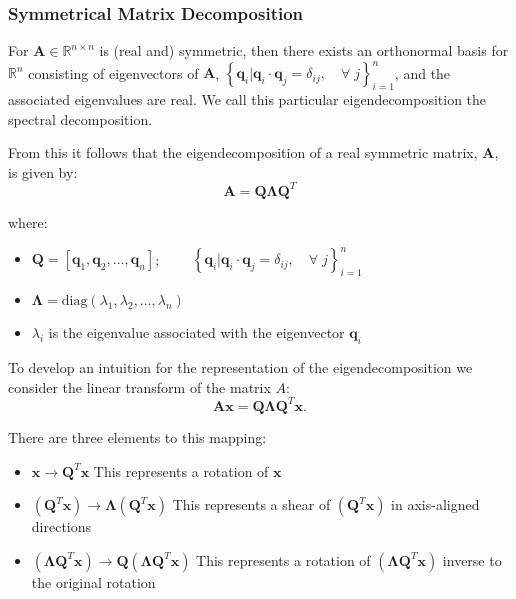 \subsubsection{Symmetrical Matrix Decomposition}
\begin{definition}
For $\mathbf{A} \in \mathbb{R}^{n \times n}$ is (real and) symmetric, then
there exists an orthonormal basis for $\mathbb{R}^n$ consisting of
eigenvectors of $\mathbf{A}$, ${\left\{ \mathbf{q}_i \vert \mathbf{q}_i \cdot
\mathbf{q}_j = \delta_{ij}, \quad \forall \; j \right\}}_{i=1}^n$, and the
associated eigenvalues are real. We call this particular eigendecomposition the
spectral decomposition.

From this it follows that the eigendecomposition of a real symmetric matrix, $\mathbf{A}$, is given by:
\[\mathbf{A} = \mathbf{Q} \boldsymbol{\Lambda} \mathbf{Q}^{T}\]

where:
\begin{itemize}
  \item $\mathbf{Q} = [\mathbf{q}_1, \mathbf{q}_2,\ldots,\mathbf{q}_n]$; $\qquad{\left\{ \mathbf{q}_i \vert \mathbf{q}_i \cdot \mathbf{q}_j = \delta_{ij},\quad \forall \; j \right\}}_{i=1}^n$
  \item $\boldsymbol{\Lambda} = \mbox{diag}(\lambda_1, \lambda_2,\ldots,\lambda_n)$
  \item $\lambda_{i}$ is the eigenvalue associated with the eigenvector $\mathbf{q}_i$
\end{itemize}
\end{definition}
To develop an intuition for the representation of the eigendecomposition we consider the
linear transform of the matrix $A$:
 \[\mathbf{A} \mathbf{x} = \mathbf{Q} \boldsymbol{\Lambda} \mathbf{Q}^{T} \mathbf{x}.\] 

There are three elements to this mapping:
\begin{itemize}
  \item $\mathbf{x} \rightarrow \mathbf{Q}^T \mathbf{x}$
     This represents a rotation of $\mathbf{x}$
   \item $(\mathbf{Q}^T \mathbf{x}) \rightarrow \boldsymbol{\Lambda} (\mathbf{Q}^T \mathbf{x})$    
     This represents a shear of $(\mathbf{Q}^T \mathbf{x})$ in axis-aligned directions
   \item $(\boldsymbol{\Lambda} \mathbf{Q}^T \mathbf{x}) \rightarrow \mathbf{Q} (\boldsymbol{\Lambda} \mathbf{Q}^T \mathbf{x})$    
     This represents a rotation of $(\boldsymbol{\Lambda} \mathbf{Q}^T \mathbf{x})$ inverse to the original rotation
\end{itemize}

